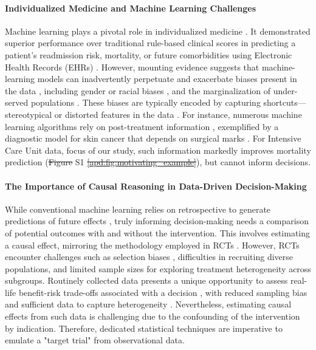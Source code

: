 \documentclass[10pt,letterpaper]{article}
\providecommand{\DIFaddtex}[1]{{\protect\color{blue}\uwave{#1}}} %
\providecommand{\DIFdeltex}[1]{{\protect\color{red}\sout{#1}}}                      %
\providecommand{\DIFaddbegin}{} %
\providecommand{\DIFaddend}{} %
\providecommand{\DIFdelbegin}{} %
\providecommand{\DIFdelend}{} %
\providecommand{\DIFadd}[1]{\texorpdfstring{\DIFaddtex{#1}}{#1}} %
\providecommand{\DIFdel}[1]{\texorpdfstring{\DIFdeltex{#1}}{}} %
\newcommand{\DIFscaledelfig}{0.5}
\newlength{\DIFdelgraphicswidth} %
\newlength{\DIFdelgraphicsheight} %
\newcommand{\DIFaddincludegraphics}[2][]{{\color{blue}\fbox{\DIFOincludegraphics[#1]{#2}}}} %
\newcommand{\DIFdelincludegraphics}[2][]{%
\sbox{\DIFdelgraphicsbox}{\DIFOincludegraphics[#1]{#2}}%
\settoboxwidth{\DIFdelgraphicswidth}{\DIFdelgraphicsbox} %
\settoboxtotalheight{\DIFdelgraphicsheight}{\DIFdelgraphicsbox} %
\scalebox{\DIFscaledelfig}{%
\parbox[b]{\DIFdelgraphicswidth}{\usebox{\DIFdelgraphicsbox}\\[-\baselineskip] \rule{\DIFdelgraphicswidth}{0em}}\llap{\resizebox{\DIFdelgraphicswidth}{\DIFdelgraphicsheight}{%
\setlength{\unitlength}{\DIFdelgraphicswidth}%
\begin{picture}(1,1)%
\thicklines\linethickness{2pt} %
{\color[rgb]{1,0,0}\put(0,0){\framebox(1,1){}}}%
{\color[rgb]{1,0,0}\put(0,0){\line( 1,1){1}}}%
{\color[rgb]{1,0,0}\put(0,1){\line(1,-1){1}}}%
\end{picture}%
}\hspace*{3pt}}} %
} %
\DeclareRobustCommand{\DIFaddbegin}{\DIFOaddbegin \let\includegraphics\DIFaddincludegraphics} %
\DeclareRobustCommand{\DIFaddend}{\DIFOaddend \let\includegraphics\DIFOincludegraphics} %
\DeclareRobustCommand{\DIFdelbegin}{\DIFOdelbegin \let\includegraphics\DIFdelincludegraphics} %
\DeclareRobustCommand{\DIFdelend}{\DIFOaddend \let\includegraphics\DIFOincludegraphics} %
\begin{document}
\paragraph{Individualized Medicine and Machine Learning Challenges}
Machine learning plays a pivotal role in individualized medicine  \cite{rajkomar2018scalable,liu2019comparison,li2020behrt,beaulieu2021machine,aggarwal2021diagnostic}. It
demonstrated superior performance over traditional rule-based clinical scores in predicting a patient's readmission risk, mortality, or future comorbidities using Electronic Health Records (EHRs) \cite{rajkomar2018scalable,liu2019comparison,li2020behrt,beaulieu2021machine,aggarwal2021diagnostic}.
However, mounting evidence suggests that machine-learning models can inadvertently perpetuate and exacerbate biases present in the data \cite{rajkomar2018ensuring}, including gender or racial biases \cite{singh2022generalizability,gichoya2022ai}, and the marginalization of under-served populations \cite{seyyed2021underdiagnosis}. These biases are typically encoded by capturing shortcuts—stereotypical or distorted features in the data \cite{geirhos2020shortcut,winkler2019association,degrave2021ai}.
%
For instance, numerous machine learning algorithms rely on post-treatment information \cite{badgeley2019deep,obermeyer2019dissecting,yuan2021temporal,wong2021external}, exemplified by a diagnostic model for skin cancer that depends on surgical marks \cite{winkler2019association}. For Intensive Care Unit data, focus of our study, such information markedly improves mortality prediction (\DIFdelbegin \DIFdel{Figure }\DIFdelend S1 \DIFdelbegin \DIFdel{\ref{apd:fig:motivating_example}}\DIFdelend \DIFaddbegin \DIFadd{Fig}\DIFaddend ), but cannot inform decisions.

\paragraph{The Importance of Causal Reasoning in Data-Driven Decision-Making} \cite{prosperi2020causal}
While conventional machine learning relies on retrospective to generate predictions of future effects \cite{plecko2022causal}, truly informing decision-making needs a comparison of potential outcomes with and without the intervention. This involves estimating a causal effect, mirroring the methodology employed in RCTs \cite{prosperi2020causal}. However, RCTs encounter challenges such as selection biases \cite{travers2007external,averitt2020translating}, difficulties in recruiting diverse populations, and limited sample sizes for exploring treatment heterogeneity across subgroups. Routinely collected data presents a unique opportunity to assess real-life benefit-risk trade-offs associated with a decision \cite{desai2021broadening}, with reduced sampling bias and sufficient data to capture heterogeneity \cite{rekkas2023standardized}. Nevertheless, estimating causal effects from such data is challenging due to the confounding of the intervention by indication. Therefore, dedicated statistical techniques are imperative to emulate a "target trial" \cite{hernan2016specifying} from observational data.
\end{document}
